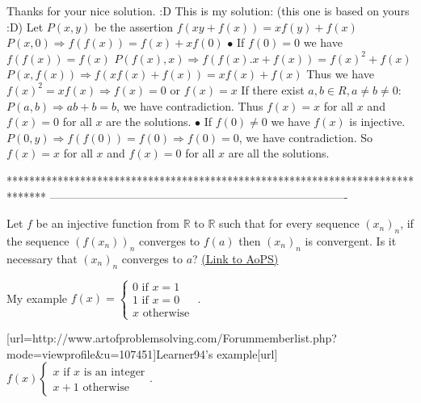 \begin{solution}
	Thanks for your nice solution. :D This is my solution: (this one is based on yours :D)
Let $P(x,y)$ be the assertion $f(xy+f(x))=xf(y)+f(x)$
$P(x,0) \Rightarrow f(f(x))=f(x)+xf(0)$
$\bullet$ If $f(0)=0$ we have $f(f(x))=f(x)$
$P(f(x),x) \Rightarrow f(f(x).x+f(x))=f(x)^2+f(x)$
$P(x,f(x)) \Rightarrow f(xf(x)+f(x))=xf(x)+f(x)$
Thus we have $f(x)^2=xf(x) \Rightarrow f(x)=0$ or $f(x)=x$
If there exist $a,b \in R, a \neq b \neq 0$: $P(a,b) \Rightarrow ab+b=b$, we have contradiction.
Thus $f(x)=x$ for all $x$ and $f(x)=0$ for all $x$ are the solutions.
$\bullet$ If $f(0) \neq 0$ we have $f(x)$ is injective.
$P(0,y) \Rightarrow f(f(0))=f(0) \Rightarrow f(0)=0$, we have contradiction.
So $f(x)=x$ for all $x$ and $f(x)=0$ for all $x$ are all the solutions.
\end{solution}
*******************************************************************************
-------------------------------------------------------------------------------

\begin{problem}
	Let $f$ be an injective function from $\mathbb R$ to $\mathbb R$ such that for every sequence $(x_n)_n$, if  the sequence $(f(x_n))_n$ converges to $f(a)$ then $(x_n)_n$ is convergent.
Is it necessary that $(x_n)_n$ converges to $ a $?
	\flushright \href{https://artofproblemsolving.com/community/c7h570617}{(Link to AoPS)}
\end{problem}



\begin{solution}
	My example $f(x)=\begin{cases}0\text{ if } x=1\\ 1\text{ if } x=0\\ x\text{ otherwise }\end{cases}$.

[url=http://www.artofproblemsolving.com/Forum\/memberlist.php?mode=viewprofile&u=107451]Learner94's example[\/url] $f(x)\begin{cases}x\text{ if } x\text{ is}\text{ an}\text{ integer}\\x+1\text{ otherwise }\end{cases}$.
\end{solution}



